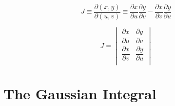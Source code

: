 \begin{equation*}
    J \equiv \frac{\partial (x,y)}{\partial (u,v)} \equiv 
    \frac{\partial x}{\partial u}\frac{\partial y}{\partial v} -
    \frac{\partial x}{\partial v}\frac{\partial y}{\partial u}
\end{equation*}

\begin{equation*}
    J =
    \begin{vmatrix}
        \dfrac{\partial x}{\partial u} & \dfrac{\partial y}{\partial v} \\[2ex]
        \dfrac{\partial x}{\partial v} & \dfrac{\partial y}{\partial u} \\
    \end{vmatrix}
\end{equation*}

\section{The Gaussian Integral}
